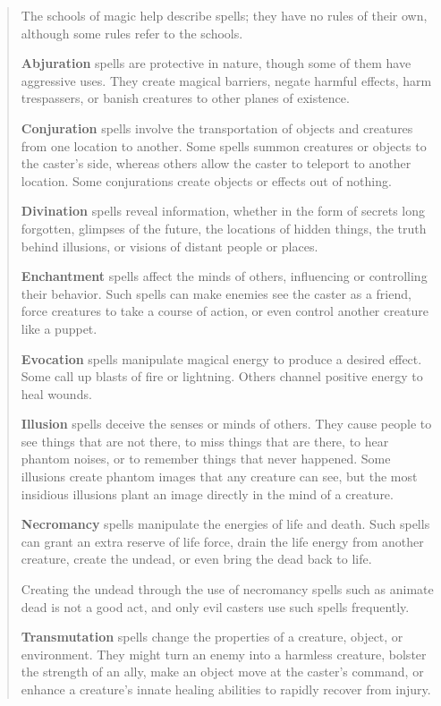 \documentclass[
]{article}
\begin{document}
\begin{quote}
The schools of magic help describe spells; they have no rules of their
own, although some rules refer to the schools.

\textbf{Abjuration} spells are protective in nature, though some of them
have aggressive uses. They create magical barriers, negate harmful
effects, harm trespassers, or banish creatures to other planes of
existence.

\textbf{Conjuration} spells involve the transportation of objects and
creatures from one location to another. Some spells summon creatures or
objects to the caster's side, whereas others allow the caster to
teleport to another location. Some conjurations create objects or
effects out of nothing.

\textbf{Divination} spells reveal information, whether in the form of
secrets long forgotten, glimpses of the future, the locations of hidden
things, the truth behind illusions, or visions of distant people or
places.

\textbf{Enchantment} spells affect the minds of others, influencing or
controlling their behavior. Such spells can make enemies see the caster
as a friend, force creatures to take a course of action, or even control
another creature like a puppet.

\textbf{Evocation} spells manipulate magical energy to produce a desired
effect. Some call up blasts of fire or lightning. Others channel
positive energy to heal wounds.

\textbf{Illusion} spells deceive the senses or minds of others. They
cause people to see things that are not there, to miss things that are
there, to hear phantom noises, or to remember things that never
happened. Some illusions create phantom images that any creature can
see, but the most insidious illusions plant an image directly in the
mind of a creature.

\textbf{Necromancy} spells manipulate the energies of life and death.
Such spells can grant an extra reserve of life force, drain the life
energy from another creature, create the undead, or even bring the dead
back to life.

Creating the undead through the use of necromancy spells such as animate
dead is not a good act, and only evil casters use such spells
frequently.

\textbf{Transmutation} spells change the properties of a creature,
object, or environment. They might turn an enemy into a harmless
creature, bolster the strength of an ally, make an object move at the
caster's command, or enhance a creature's innate healing abilities to
rapidly recover from injury.
\end{quote}
\end{document}
